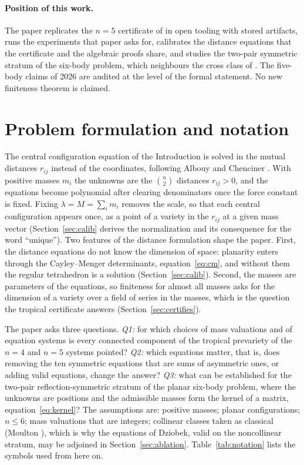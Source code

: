 \documentclass[11pt]{article}
\theoremstyle{definition}
\theoremstyle{remark}
\begin{document}
\paragraph{Position of this work.}
The paper replicates the $n=5$ certificate of \cite{JL25} in open tooling with stored artifacts, runs the experiments that paper
asks for, calibrates the distance equations that the certificate and the algebraic proofs share, and studies the two-pair symmetric
stratum of the six-body problem, which neighbours the cross class of \cite{DP18}. The five-body claims of 2026 are audited at the
level of the formal statement. No new finiteness theorem is claimed.

\section{Problem formulation and notation}\label{sec:problem}

The central configuration equation of the Introduction is solved in the mutual distances $r_{ij}$ instead of the coordinates,
following Albouy and Chenciner \cite{AC98}. With positive masses $m_i$ the unknowns are the $\binom n2$ distances $r_{ij}>0$, and
the equations become polynomial after clearing denominators once the force constant is fixed. Fixing $\lambda=M=\sum_i m_i$ removes
the scale, so that each central configuration appears once, as a point of a variety in the $r_{ij}$ at a given mass vector
(Section~\ref{sec:calib} derives the normalization and its consequence for the word ``unique''). Two features of the distance
formulation shape the paper. First, the distance equations do not know the dimension of space: planarity enters through the
Cayley--Menger determinants, equation~\eqref{eq:cm}, and without them the regular tetrahedron is a solution (Section~\ref{sec:calib}).
Second, the masses are parameters of the equations, so finiteness for almost all masses asks for the dimension of a variety over a field
of series in the masses, which is the question the tropical certificate answers (Section~\ref{sec:certifies}).

The paper asks three questions. \emph{Q1:} for which choices of mass valuations and of equation systems is every connected component of the
tropical prevariety of the $n=4$ and $n=5$ systems pointed? \emph{Q2:} which equations matter, that is, does removing the ten symmetric
equations that are sums of asymmetric ones, or adding valid equations, change the answer? \emph{Q3:} what can be established for the
two-pair reflection-symmetric stratum of the planar six-body problem, where the unknowns are positions and the admissible masses form
the kernel of a matrix, equation~\eqref{eq:kernel}? The assumptions are: positive masses; planar configurations; $n\le6$; mass valuations that
are integers; collinear classes taken as classical (Moulton \cite{Moulton10}), which is why the equations of Dziobek, valid on the noncollinear
stratum, may be adjoined in Section~\ref{sec:ablation}. Table~\ref{tab:notation} lists the symbols used from here on.
\end{document}

